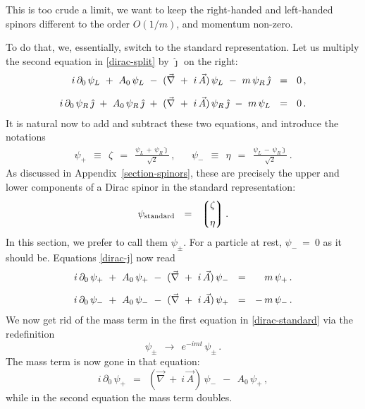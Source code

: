 \documentclass[epsfig,12pt]{article}
\newcommand{\p}{\partial}
\newcommand{\lgr}{\left\lgroup}
\newcommand{\rgr}{\right\rgroup}
\newcommand{\jj}{\hat\jmath}
\begin{document}
	This is too crude a limit, we want to keep the right-handed and left-handed
	spinors different to the order $ O(1/m) $, and momentum non-zero.
	
	To do that, we, essentially, switch to the standard representation.
	Let us multiply the second equation in \eqref{dirac-split} by $ \jj $
	on the right:
\begin{align}
%
\notag
	i\,\p_0\,\psi_L  ~+~  A_0\,\psi_L  ~-~  (\vec\nabla ~+~ i\,\vec A)\,\psi_L
	~-~  m\, \psi_R\, \jj	& ~~=~~	0\,,
	\\[2mm]
%
\label{dirac-j}
	i\,\p_0\,\psi_R\,\jj  ~+~  A_0\,\psi_R\,\jj  ~+~  (\vec\nabla ~+~ i\,\vec A)\,\psi_R\,\jj
	~-~  m\, \psi_L  & ~~=~~ 0\,.
\end{align}
	It is natural now to add and subtract these two equations, and introduce the notations
\begin{align}
	\psi_+		~~\equiv~~	\zeta	~~=~~	\frac{\psi_L \,+\, \psi_R \jj}{\sqrt{2}}\,,
	&&
	\psi_-		~~\equiv~~	\eta	~~=~~	\frac{\psi_L \,-\, \psi_R \jj}{\sqrt{2}}\,.
\label{standard}
\end{align}
	As discussed in Appendix~\ref{section-spinors}, these are precisely the upper
	and lower components of a Dirac spinor in the standard representation:
\begin{equation}
	\psi_\text{standard}	~~=~~	
		\lgr 
			\begin{matrix}
				\zeta	\\[2mm]
				\eta
			\end{matrix}
		\rgr.
\end{equation}
	In this section, we prefer to call them $ \psi_\pm $.
	For a particle at rest, $ \psi_- ~=~ 0 $ as it should be.
	Equations \eqref{dirac-j} now read
\begin{align}
%
\notag
	i\,\p_0\,\psi_+  ~+~  A_0\, \psi_+  ~-~  (\vec\nabla ~+~  i\,\vec A)\, \psi_-	& ~~=~~  \phantom{+}\,m\,\psi_+\,.
	\\[2mm]
\label{dirac-standard}
	i\,\p_0\,\psi_-  ~+~  A_0\, \psi_-  ~-~  (\vec\nabla ~+~  i\,\vec A)\,\psi_+	& ~~=~~ -\,m\,\psi_-\,.
\end{align}
	We now get rid of the mass term in the first equation in \eqref{dirac-standard} via the redefinition
\[
	\psi_\pm	~~\to~~		e^{-i m t}\, \psi_\pm\,.
\]
	The mass term is now gone in that equation:
\begin{equation}
	i\,\p_0\,\psi_+		~~=~~	(\vec\nabla ~+~ i\,\vec A)\,\psi_-  ~~-~~  A_0\, \psi_+\,,
\end{equation}
	while in the second equation the mass term doubles.
\end{document}
